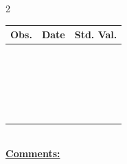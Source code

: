 
\bigskip 
\begin{multicols}{2}{ 
\begin{tabular}{ccc}
\hline  Obs.  &  Date &  Std. Val. \\ 
\hline 
  & &  \vspace{-.12in} \\  
  & &  \vspace{-.12in} \\  
  & &  \vspace{-.12in} \\  
  & &  \vspace{-.12in} \\  
  & &  \vspace{-.12in} \\  
  & &  \vspace{-.12in} \\  
  & &  \vspace{-.12in} \\  
  & &  \vspace{-.12in} \\  
  & &  \vspace{-.12in} \\  
  & &  \vspace{-.12in} \\  
  & &  \vspace{-.12in} \\  
  & &  \vspace{-.12in} \\  
  & &  \vspace{-.12in} \\  
  & &  \vspace{-.12in} \\  
  & &  \vspace{-.12in} \\  
  & &  \vspace{-.12in} \\  
  & &  \vspace{-.12in} \\  
  & &  \vspace{-.12in} \\  
  & &  \vspace{-.12in} \\  
  & &  \vspace{-.12in} \\  
  & &  \vspace{-.12in} \\  
  & &  \vspace{-.12in} \\  
 \end{tabular} 
\\ 
 \columnbreak 
 \singlespacing 
 \underline{\textbf{Comments:}} \\ 
 \bigskip       

 } 
\end{multicols} 
